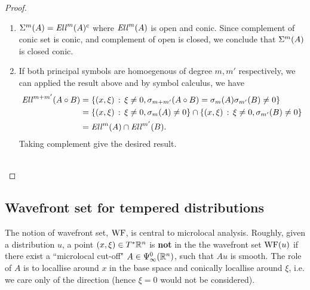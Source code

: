 \documentclass[12pt]{article}
\begin{document}
\begin{proof}
\begin{enumerate}
        \item $\Sigma^m(A) = \mathit{Ell}^m(A)^c$ where $\mathit{Ell}^m(A)$ is open and conic. Since complement of conic set is conic, and complement of open is closed, we conclude that $\Sigma^m(A)$ is closed conic. 
        
        
        \item If both principal symbols are homoegenous of degree $m, m'$ respectively, we can applied the result above and by symbol calculus, we have
        \begin{align*}
            \mathit{Ell}^{m + m'}(A \circ B) 
            & = \left\{(x, \xi) \, : \, \xi \neq 0, \sigma_{m + m'}(A \circ B) = \sigma_m(A) \sigma_{m'}(B) \neq 0\right\}\\
            & = \left\{(x, \xi) \, : \, \xi \neq 0, \sigma_m(A)  \neq 0\right\} \cap  \left\{(x, \xi) \, : \, \xi \neq 0, \sigma_{m'}(B)  \neq 0\right\} \\
            & = \mathit{Ell}^m(A) \cap \mathit{Ell}^{m'}(B). 
        \end{align*}
        Taking complement give the desired result. \\
        \\
    \end{enumerate}
    
\end{proof}



\subsection{Wavefront set for tempered distributions}
The notion of wavefront set, $\mathrm{WF}$,  is central to microlocal analysis. Roughly, given a distribution $u$, a point $(x, \xi) \in T^*{\mathbb R}^n$ is \textbf{not} in the the wavefront set $\mathrm{WF}(u)$ if there exist a ``microlocal cut-off" $A \in \Psi^{0}_{\infty}({\mathbb R}^n)$, 
such that $A u $ is smooth. The role of $A$ is to locallise around $x$ in the base space and conically locallise around $\xi$, i.e. we care only of the direction (hence $\xi = 0$ would not be considered). 
\begin{center}
\end{center}
\end{document}
